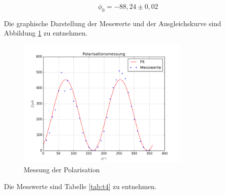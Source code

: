 \begin{equation*}
\phi_0=-88,24\pm0,02
\end{equation*}

\noindent Die graphische Darstellung der Messwerte und der Ausgleichskurve sind Abbildung \ref{fig:pol} zu entnehmen.

\begin{figure}[H]
	\centering
	\includegraphics[width=0.75\textwidth]{plots/pol}
	\caption{Messung der Polarisation}
	\label{fig:pol}
\end{figure}

\noindent Die Messwerte sind Tabelle \ref{tab:t4} zu entnehmen.

